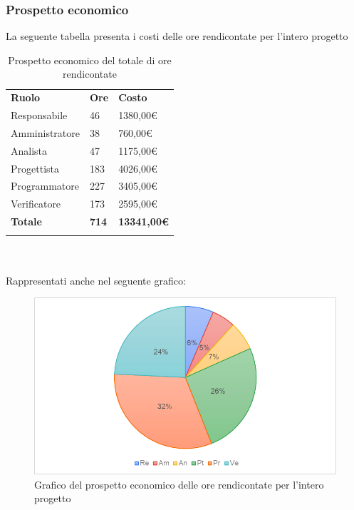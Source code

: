 \subsubsection{Prospetto economico}
La seguente tabella presenta i costi delle ore rendicontate per l'intero progetto\glo
\begin{longtable} {
		>{}p{32mm}
		>{}p{20mm}
		>{}p{20mm}
	}
	\rowcolor{gray!50}
	
	\textbf{Ruolo} & \textbf{Ore} & \textbf{Costo} \TBstrut \\
	Responsabile & 46 & 1380,00\euro{} \TBstrut \\
	Amministratore & 38 & 760,00\euro{} \TBstrut \\
	Analista & 47 & 1175,00\euro{} \TBstrut \\
	Progettista & 183 & 4026,00\euro{} \TBstrut \\
	Programmatore & 227 & 3405,00\euro{} \TBstrut \\
	Verificatore & 173 & 2595,00\euro{} \TBstrut \\
	\textbf{Totale} & \textbf{714}& \textbf{13341,00\euro{}} \TBstrut \\		
	\rowcolor{white}
	\caption{Prospetto economico del totale di ore rendicontate}
\end{longtable} \mbox{} \\ \\
Rappresentati anche nel seguente grafico:
\begin{figure} [H]
	\includegraphics[width=\linewidth]{./img/Grafici/12.png}
	\caption{Grafico del prospetto economico delle ore rendicontate per l'intero progetto\glo}
\end{figure}
	
